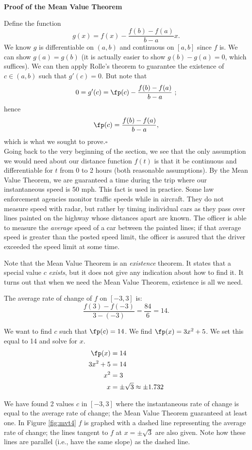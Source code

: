\noindent\textbf{Proof of the Mean Value Theorem}

Define the function $$g(x) = f(x) - \frac{f(b)-f(a)}{b-a}x.$$  We know $g$ is differentiable on $(a,b)$ and  continuous on $[a,b]$ since $f$ is. We can show $g(a)=g(b)$ (it is actually easier to show $g(b)-g(a)=0$, which suffices). We can then apply Rolle's theorem to guarantee the existence of $c \in (a,b)$ such that $g'(c) = 0$.  But note that $$0= g'(c) = \fp(c) - \frac{f(b)-f(a)}{b-a} \ ;$$ hence $$\fp(c) = \frac{f(b)-f(a)}{b-a},$$ which is what we sought to prove.\hfill $\square$\\

Going back to the very beginning of the section, we see that the only assumption we would need about our distance function $f(t)$ is that it be continuous and differentiable for $t$ from 0 to 2 hours (both reasonable assumptions).  By the Mean Value Theorem, we are guaranteed a time during the trip where our instantaneous speed is 50 mph. This fact is used in practice. Some law enforcement agencies monitor traffic speeds while in aircraft. They do not measure speed with radar, but rather by timing individual cars as they pass over lines painted on the highway whose distances apart are known. The officer is able to measure the \textit{average} speed of a car between the painted lines; if that average speed is greater than the posted speed limit, the officer is assured that the driver exceeded the speed limit at some time.

Note that the Mean Value Theorem is an \textit{existence} theorem. It states that a special value $c$ \textit{exists}, but it does not give any indication about how to find it. It turns out that when we need the Mean Value Theorem, existence is all we need.\\

{The average rate of change of $f$ on $[-3,3]$ is:
		$$\frac{f(3)-f(-3)}{3-(-3)} = \frac{84}{6} = 14.$$
		
We want to find $c$ such that $\fp(c) = 14$. We find $\fp(x) = 3x^2+5$. We set this equal to 14 and solve for $x$. 
		\begin{align*}
		\fp(x) &= 14 \\
		3x^2 +5 &= 14\\
		x^2  &= 3\\
		x &= \pm \sqrt{3} \approx \pm 1.732
		\end{align*}
		
We have found 2 values $c$ in $[-3,3]$ where the instantaneous rate of change is equal to the average rate of change; the Mean Value Theorem guaranteed at least one. In Figure \ref{fig:mvt4} $f$ is graphed with a dashed line representing the average rate of change; the lines tangent to $f$ at $x=\pm \sqrt{3}$ are also given. Note how these lines are parallel (i.e., have the same slope) as the dashed line.
}\\

